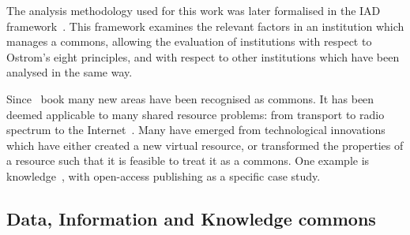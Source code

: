 The analysis methodology used for this work was later formalised in the \ac{IAD} framework~\citep{Ostrom2005}. 
This framework examines the relevant factors in an institution which manages a commons, allowing the evaluation of institutions with respect to Ostrom's eight principles, and with respect to other institutions which have been analysed in the same way.

Since~ book many new areas have been recognised as commons. It has been deemed applicable to many shared resource problems: from transport to radio spectrum to the Internet~\citep{Hess2000}. 
Many have emerged from technological innovations which have either created a new virtual resource, or transformed the properties of a resource such that it is feasible to treat it as a commons. One example is knowledge~\citep{Hess2007}, with open-access publishing as a specific case study. 



\subsection{Data, Information and Knowledge commons}

